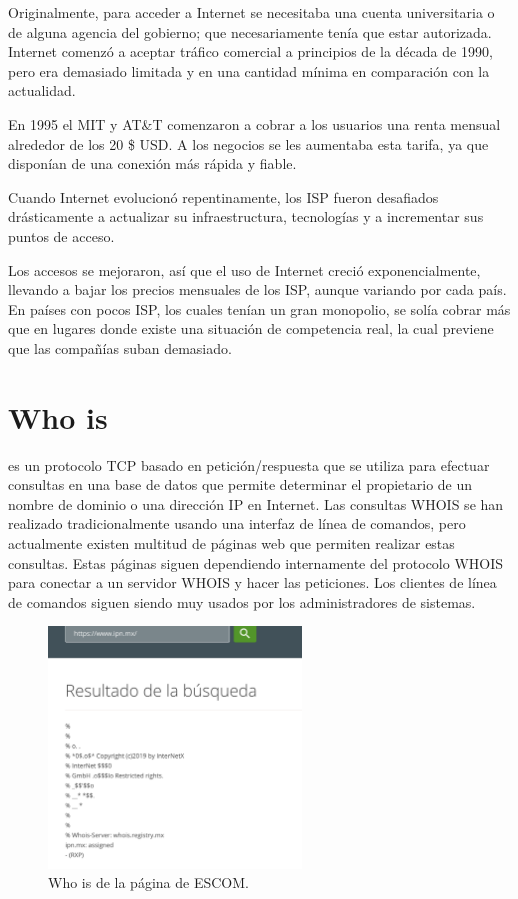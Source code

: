 \documentclass[a4paper,12pt]{article}
\begin{document}
Originalmente, para acceder a Internet se necesitaba una cuenta universitaria o de alguna agencia del gobierno; que necesariamente tenía que estar autorizada. Internet comenzó a aceptar tráfico comercial a principios de la década de 1990, pero era demasiado limitada y en una cantidad mínima en comparación con la actualidad. 

En 1995 el MIT y AT\&T comenzaron a cobrar a los usuarios una renta mensual alrededor de los 20 \$ USD. A los negocios se les aumentaba esta tarifa, ya que disponían de una conexión más rápida y fiable.

Cuando Internet evolucionó repentinamente, los ISP fueron desafiados drásticamente a actualizar su infraestructura, tecnologías y a incrementar sus puntos de acceso.

Los accesos se mejoraron, así que el uso de Internet creció exponencialmente, llevando a bajar los precios mensuales de los ISP, aunque variando por cada país. En países con pocos ISP, los cuales tenían un gran monopolio, se solía cobrar más que en lugares donde existe una situación de competencia real, la cual previene que las compañías suban demasiado.
\section{Who is}

es un protocolo TCP basado en petición/respuesta que se utiliza para efectuar consultas en una base de datos que permite determinar el propietario de un nombre de dominio o una dirección IP en Internet. Las consultas WHOIS se han realizado tradicionalmente usando una interfaz de línea de comandos, pero actualmente existen multitud de páginas web que permiten realizar estas consultas. Estas páginas siguen dependiendo internamente del protocolo WHOIS para conectar a un servidor WHOIS y hacer las peticiones. Los clientes de línea de comandos siguen siendo muy usados por los administradores de sistemas.

\begin{figure}[h]
\centering
\includegraphics[width=0.60\textwidth]{figuno}
\caption{Who is de la página de ESCOM.}
\end{figure}
\end{document}
